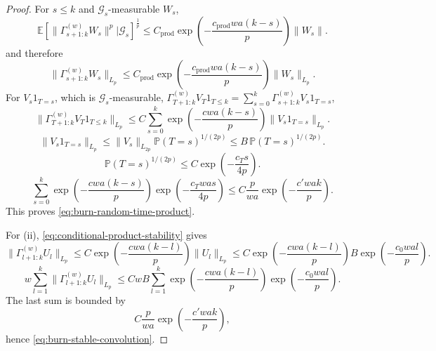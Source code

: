 \begin{proof} For $s \le k$ and $\mathcal{G}_{s}$-measurable $W_{s}$,
\begin{equation}
\mathbb{E} \left[ \lVert \Gamma_{s + 1:k}^{(w)} W_{s} \rVert^{p} | \mathcal{G}_{s} \right]^{\frac{1}{p}}
  \le C_{\mathrm{prod}} \exp\left(- \frac{c_{\mathrm{prod}} w a (k - s)}{p}\right)
     \lVert W_{s} \rVert.
\label{eq:conditional-product-pointwise}
\end{equation}
and therefore
\begin{equation}
\lVert \Gamma_{s + 1:k}^{(w)} W_{s} \rVert_{L_{p}}
  \le C_{\mathrm{prod}} \exp\left(- \frac{c_{\mathrm{prod}} w a (k - s)}{p}\right)
     \lVert W_{s} \rVert_{L_{p}}.
\label{eq:conditional-product-stability}
\end{equation}
For $V_{s} 1_{T = s}$, which is $\mathcal{G}_{s}$-measurable,
$\Gamma_{T + 1:k}^{(w)} V_{T} 1_{T \le k}
  = \sum_{s = 0}^{k} \Gamma_{s + 1:k}^{(w)} V_{s} 1_{T = s}$,
\[
\lVert \Gamma_{T + 1:k}^{(w)} V_{T} 1_{T \le k} \rVert_{L_{p}}
  \le C \sum_{s = 0}^{k}
    \exp\left(- \frac{c w a (k - s)}{p}\right)
    \lVert V_{s} 1_{T = s} \rVert_{L_{p}}.
\]
\[
\lVert V_{s} 1_{T = s} \rVert_{L_{p}}
  \le \lVert V_{s} \rVert_{L_{2p}} \mathbb{P}(T = s)^{1 / (2p)}
  \le B \, \mathbb{P}(T = s)^{1 / (2p)}.
\]
\[
\mathbb{P}(T = s)^{1 / (2p)}
  \le C \exp\left(- \frac{c_{T} s}{4 p}\right).
\]
\[
\sum_{s = 0}^{k}
  \exp\left(- \frac{c w a (k - s)}{p}\right)
  \exp\left(- \frac{c_{T} w a s}{4 p}\right)
  \le C \frac{p}{w a}
     \exp\left(- \frac{c' w a k}{p}\right).
\]
This proves \eqref{eq:burn-random-time-product}.

For (ii), \eqref{eq:conditional-product-stability} gives
\[
\lVert \Gamma_{l + 1:k}^{(w)} U_{l} \rVert_{L_{p}}
  \le C \exp\left(- \frac{c w a (k - l)}{p}\right)
     \lVert U_{l} \rVert_{L_{p}}
  \le C \exp\left(- \frac{c w a (k - l)}{p}\right)
     B \exp\left(- \frac{c_{0} w a l}{p}\right).
\]
\[
w \sum_{l = 1}^{k}
  \lVert \Gamma_{l + 1:k}^{(w)} U_{l} \rVert_{L_{p}}
  \le C w B \sum_{l = 1}^{k}
     \exp\left(- \frac{c w a (k - l)}{p}\right)
     \exp\left(- \frac{c_{0} w a l}{p}\right).
\]
The last sum is bounded by
\[
C \frac{p}{w a} \exp\left(- \frac{c' w a k}{p}\right),
\]
hence
\eqref{eq:burn-stable-convolution}. \end{proof}


